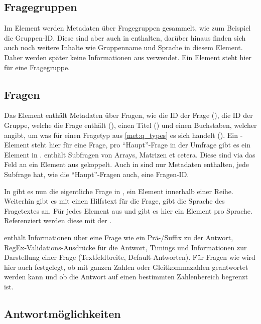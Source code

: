 \subsection{Fragegruppen}

Im Element  werden Metadaten über Fragegruppen gesammelt, wie zum Beispiel die Gruppen-ID.
Diese sind aber auch in  enthalten, darüber hinaus finden sich auch noch weitere Inhalte wie Gruppenname und Sprache in diesem Element.
Daher werden später keine Informationen aus  verwendet.
Ein  Element steht hier für eine Fragegruppe.

\subsection{Fragen}

Das Element  enthält Metadaten über Fragen, wie die ID der Frage (), die ID der Gruppe, welche die Frage enthält (), einen Titel () und einen Buchstaben, welcher angibt, um was für einen Fragetyp aus \cref{met:q_types} es sich handelt ().
Ein -Element steht hier für eine Frage, pro \enquote{Haupt}-Frage in der Umfrage gibt es ein Element in .
 enthält Subfragen von Arrays, Matrizen et cetera. Diese sind via das Feld  an ein Element aus  gekoppelt.
Auch in  sind nur Metadaten enthalten, jede Subfrage hat, wie die \enquote{Haupt}-Fragen auch, eine Fragen-ID.

In  gibt es nun die eigentliche Frage in , ein Element innerhalb einer Reihe.
Weiterhin gibt es mit  einen Hilfstext für die Frage,  gibt die Sprache des Fragetextes an.
Für jedes Element aus  und  gibt es hier ein Element pro Sprache.
Referenziert werden diese mit der .

 enthält Informationen über eine Frage wie ein Prä-/Suffix zu der Antwort, RegEx-Validations-Ausdrücke für die Antwort, Timings und Informationen zur Darstellung einer Frage (Textfeldbreite, Default-Antworten).
Für Fragen wie  wird hier auch festgelegt, ob mit ganzen Zahlen oder Gleitkommazahlen geantwortet werden kann und ob die Antwort auf einen bestimmten Zahlenbereich begrenzt ist.

\subsection{Antwortmöglichkeiten}


